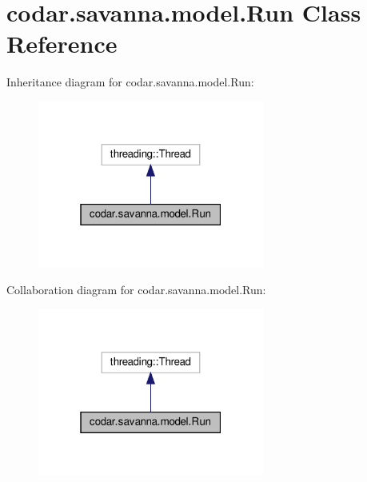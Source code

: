 \hypertarget{classcodar_1_1savanna_1_1model_1_1_run}{}\section{codar.\+savanna.\+model.\+Run Class Reference}
\label{classcodar_1_1savanna_1_1model_1_1_run}


Inheritance diagram for codar.\+savanna.\+model.\+Run\+:
\nopagebreak
\begin{figure}[H]
\begin{center}
\leavevmode
\includegraphics[width=211pt]{classcodar_1_1savanna_1_1model_1_1_run__inherit__graph}
\end{center}
\end{figure}


Collaboration diagram for codar.\+savanna.\+model.\+Run\+:
\nopagebreak
\begin{figure}[H]
\begin{center}
\leavevmode
\includegraphics[width=211pt]{classcodar_1_1savanna_1_1model_1_1_run__coll__graph}
\end{center}
\end{figure}
